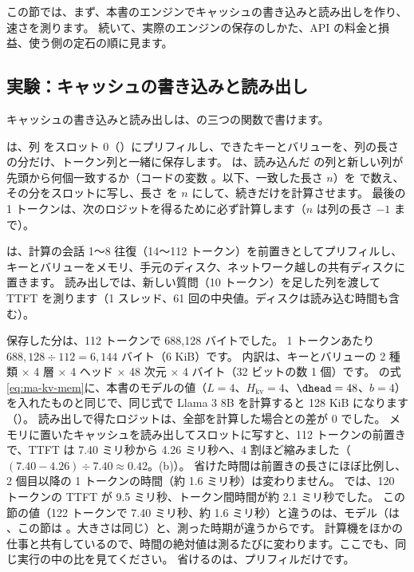 この節では、まず、本書のエンジンでキャッシュの書き込みと読み出しを作り、速さを測ります。
続いて、実際のエンジンの保存のしかた、API の料金と損益、使う側の定石の順に見ます。

\subsection*{実験：キャッシュの書き込みと読み出し}

キャッシュの書き込みと読み出しは、の三つの関数で書けます。


 は、列  をスロット 0（）にプリフィルし、できたキーとバリューを、列の長さの分だけ、トークン列と一緒に保存します。
 は、読み込んだ  の列と新しい列が先頭から何個一致するか（コードの変数 。以下、一致した長さ $n$）を  で数え、その分をスロットに写し、長さ  を $n$ にして、続きだけを計算させます。
最後の 1 トークンは、次のロジットを得るために必ず計算します（$n$ は列の長さ $-1$ まで）。

 は、計算の会話 1〜8 往復（14〜112 トークン）を前置きとしてプリフィルし、キーとバリューをメモリ、手元のディスク、ネットワーク越しの共有ディスクに置きます。
読み出しでは、新しい質問（10 トークン）を足した列を渡して TTFT を測ります（1 スレッド、61 回の中央値。ディスクは読み込む時間も含む）。

保存した分は、112 トークンで 688,128 バイトでした。
1 トークンあたり $688{,}128\div112=6{,}144$ バイト（6 KiB）です。
内訳は、キーとバリューの 2 種類 $\times$ 4 層 $\times$ 4 ヘッド $\times$ 48 次元 $\times$ 4 バイト（32 ビットの数 1 個）です。
の式\eqref{eq:ma-kv-mem}に、本書のモデルの値（$L=4$、$H_{\mathrm{kv}}=4$、$\dhead=48$、$b=4$）を入れたものと同じで、同じ式で Llama 3 8B を計算すると 128 KiB になります（）。
読み出しで得たロジットは、全部を計算した場合との差が 0 でした。
メモリに置いたキャッシュを読み出してスロットに写すと、112 トークンの前置きで、TTFT は 7.40 ミリ秒から 4.26 ミリ秒へ、4 割ほど縮みました（$(7.40-4.26)\div7.40\approx0.42$。(b)）。
省けた時間は前置きの長さにほぼ比例し、2 個目以降の 1 トークンの時間（約 1.6 ミリ秒）は変わりません。
では、120 トークンの TTFT が 9.5 ミリ秒、トークン間時間が約 2.1 ミリ秒でした。
この節の値（122 トークンで 7.40 ミリ秒、約 1.6 ミリ秒）と違うのは、モデル（は 、この節は 。大きさは同じ）と、測った時期が違うからです。
計算機をほかの仕事と共有しているので、時間の絶対値は測るたびに変わります。ここでも、同じ実行の中の比を見てください。
省けるのは、プリフィルだけです。

